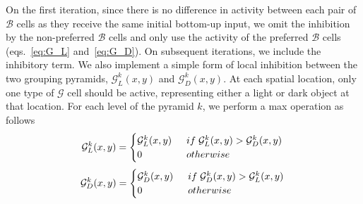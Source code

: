 On the first iteration, since there is no difference in activity between each pair of $\mathcal{B}$ cells as they receive the same initial bottom-up input, we omit the inhibition by the non-preferred
$\mathcal{B}$ cells and only use the activity of the preferred
$\mathcal{B}$ cells (eqs.~\ref{eq:G_L} and~\ref{eq:G_D}). On subsequent iterations, we include the inhibitory term. We also implement a simple form of local inhibition between the two grouping pyramids, $\mathcal{G}^k_{L}(x,y)$ and $\mathcal{G}^k_{D}(x,y)$. At each spatial location, only one type of $\mathcal{G}$ cell should be active, representing either a light or dark object at that location. For each level of the pyramid $k$, we perform a max operation as follows
\begin{equation}
	\mathcal{G}^k_{L}(x,y)=
	\begin{cases}
	\mathcal{G}^k_{L}(x,y) \:\;&if\;\mathcal{G}^k_{L}(x,y) > \mathcal{G}^k_{D}(x,y)\\
	0\;&otherwise
	\end{cases}\\
\end{equation}
\begin{equation}
	\mathcal{G}^k_{D}(x,y)=
	\begin{cases}
	\mathcal{G}^k_{D}(x,y) \:\;&if\;\mathcal{G}^k_{D}(x,y) > \mathcal{G}^k_{L}(x,y)\\
	0\;&otherwise
	\end{cases}\\
\end{equation}

